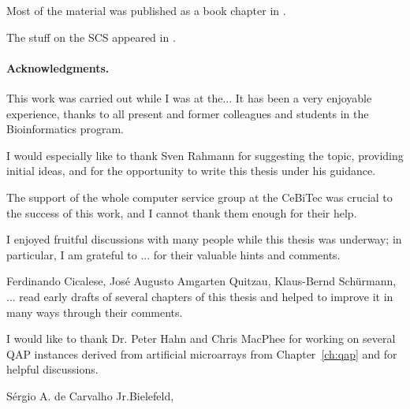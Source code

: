 Most of the material was published as a book chapter in \citet{Carvalho2007}.

The stuff on the SCS appeared in \citet{Carvalho2005}.

\paragraph{Acknowledgments.}
This work was carried out while I was at the...
It has been a very enjoyable experience, thanks to all present and
former colleagues and students in the Bioinformatics program.

I would especially like to thank Sven Rahmann for suggesting the
topic, providing initial ideas, and for the opportunity to write this
thesis under his guidance.

The support of the whole computer service group at the CeBiTec was
crucial to the success of this work, and I cannot thank them enough
for their help.

I enjoyed fruitful discussions with many people while this thesis was
underway; in particular, I am grateful to ...
for their valuable hints and comments. 

Ferdinando Cicalese, Jos\'e Augusto Amgarten Quitzau, Klaus-Bernd Sch\"urmann,
... read early drafts of several chapters of this thesis and helped to improve
it in many ways through their comments.

I would like to thank Dr. Peter Hahn and Chris MacPhee for working on
several QAP instances derived from artificial microarrays from
Chapter~\ref{ch:qap} and for helpful discussions.

\vspace*{6ex}
S\'ergio A. de Carvalho Jr.\hfill Bielefeld, \handindate
